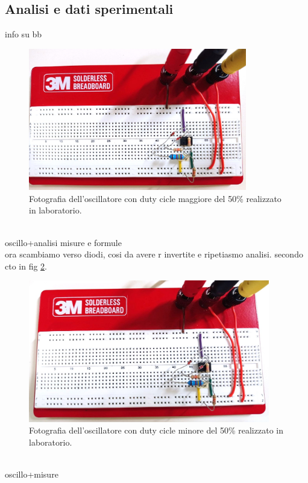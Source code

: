 \documentclass{report}
\begin{document}
\subsection{Analisi e dati sperimentali}
info su bb
\begin{figure}[h!]
	\centering
	\includegraphics[height=6.2cm]{immagini/circuito4_1.jpg}
	\caption{Fotografia dell'oscillatore con duty cicle maggiore del 50\% realizzato in laboratorio.}
	\label{figura:circuito4_1}
\end{figure}
\\oscillo+analisi misure e formule
\\ora scambiamo verso diodi, cosi da avere r invertite e ripetiasmo analisi. secondo cto in fig \ref{figura:circuito4_2}.
\begin{figure}[h!]
	\centering
	\includegraphics[height=6.2cm]{immagini/circuito4_2.jpg}
	\caption{Fotografia dell'oscillatore con duty cicle minore del 50\% realizzato in laboratorio.}
	\label{figura:circuito4_2}
\end{figure}
\\oscillo+misure

\end{document}
